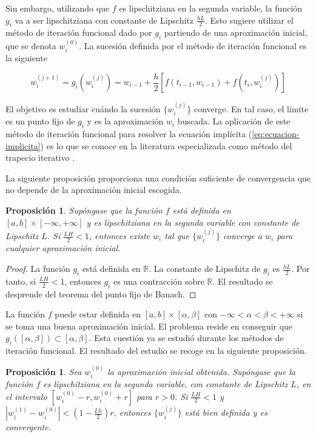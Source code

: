 \documentclass{article}
\theoremstyle{theorem-style}  %
\newtheorem{proposition}[theorem]{Proposición}
\theoremstyle{definition-style}
\theoremstyle{example-style}
\begin{document}
	Sin embargo, utilizando que $f$ es lipschitziana en la segunda variable, la función $g_i$ va a ser lipschitziana con constante de Lipschitz $\frac{hL}{2}$. Esto sugiere utilizar el método de iteración funcional dado por $g_i$ partiendo de una aproximación inicial, que se denota $w_i^{(0)}$. La sucesión definida por el método de iteración funcional es la siguiente
	

	\begin{equation} \label{eq:ti-def}
		w_{i} ^{(j+1)} = g_i(w_i^{(j)}) = w_{i-1} + \frac{h}{2} \left[f(t_{i-1}, w_{i-1}) + f(t_i, w_{i}^{(j)})\right]
	\end{equation}
	
	El objetivo es estudiar cuándo la sucesión $\{w_{i}^{(j)}\}$ converge. En tal caso, el límite es un punto fijo de $g_i$ y es la aproximación $w_i$ buscada. La aplicación de este método de iteración funcional para resolver la ecuación implícita (\ref{eq:ecuacion-implicita}) es lo que se conoce en la literatura especializada como método del trapecio iterativo \cite{akitson}.
	
	La siguiente proposición proporciona una condición suficiente de convergencia que no depende de la aproximación inicial escogida.
	
	\begin{proposition}
		Supóngase que la función $f$ está definida en $[a,b]\times[-\infty, +\infty]$ y es lipschitziana en la segunda variable con constante de Lipschitz $L$. Si $\frac{LH}{2} < 1$, entonces existe $w_i$ tal que $\{w_i^{(j)}\}$ converge a $w_i$ para cualquier aproximación inicial.
	\end{proposition}
	
	\begin{proof}
		La función $g_i$ está definida en $\mathbb{R}$. La constante de Lipschitz de $g_i$ es $\frac{hL}{2}$. Por tanto, si $\frac{LH}{2} < 1$, entonces $g_i$ es una contracción sobre $\mathbb{R}$. El resultado se desprende del teorema del punto fijo de Banach.
	\end{proof}

	La función $f$ puede estar definida en $[a,b]\times[\alpha, \beta]$ con  $-\infty < \alpha < \beta < +\infty$ si se toma una buena aproximación inicial. El problema reside en conseguir que $g_i([\alpha,\beta]) \subset [\alpha,\beta]$. Esta cuestión ya se estudió durante los métodos de iteración funcional. El resultado del estudio se recoge en la siguiente proposición.
	
	\begin{proposition}
		Sea $w_i^{(0)}$ la aproximación inicial obtenida. Supóngase que la función $f$  es lipschitziana en la segunda variable, con constante de Lipschitz $L$, en el intervalo  $[w_i^{(0)}-r,w_i^{(0)}+r]$ para $r>0$. Si $\frac{LH}{2} < 1$ y $\left|w_i^{(1)} - w_i^{(0)}\right| < (1-\frac{Lh}{2})r$, entonces $\{w_i^{(j)}\}$ está bien definida y es convergente.
	\end{proposition}
	
\end{document}
